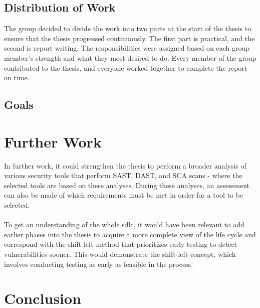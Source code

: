 
\subsection{Distribution of Work}
The group decided to divide the work into two parts at the start of the thesis to ensure that the thesis progressed continuously. The first part is practical, and the second is report writing. The responsibilities were assigned based on each group member's strength and what they most desired to do. Every member of the group contributed to the thesis, and everyone worked together to complete the report on time. 


\subsection{Goals}



\section{Further Work}

In further work, it could strengthen the thesis to perform a broader analysis of various security tools that perform SAST, DAST, and SCA scans -  where the selected tools are based on these analyses. During these analyses, an assessment can also be made of which requirements must be met in order for a tool to be selected. 
\\~\\
To get an understanding of the whole \acrlong{sdlc}, it would have been relevant to add earlier phases into the thesis to acquire a more complete view of the life cycle and correspond with the shift-left method that prioritizes early testing to detect vulnerabilities sooner. This would demonstrate the shift-left concept, which involves conducting testing as early as feasible in the process.  

\section{Conclusion}

